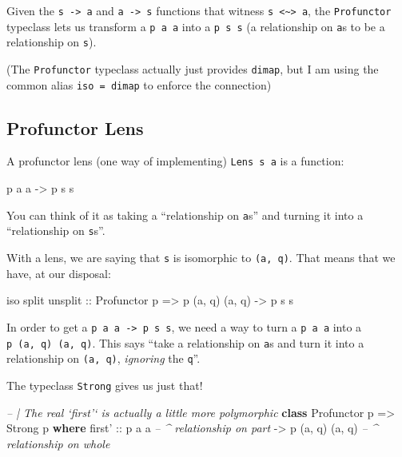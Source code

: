 \documentclass[]{article}
\newenvironment{Shaded}{}{}
\newcommand{\CommentTok}[1]{\textcolor[rgb]{0.38,0.63,0.69}{\textit{#1}}}
\newcommand{\DataTypeTok}[1]{\textcolor[rgb]{0.56,0.13,0.00}{#1}}
\newcommand{\KeywordTok}[1]{\textcolor[rgb]{0.00,0.44,0.13}{\textbf{#1}}}
\newcommand{\NormalTok}[1]{#1}
\newcommand{\OtherTok}[1]{\textcolor[rgb]{0.00,0.44,0.13}{#1}}
\begin{document}
Given the \texttt{s\ -\textgreater{}\ a} and \texttt{a\ -\textgreater{}\ s}
functions that witness
\texttt{s\ \textless{}\textasciitilde{}\textgreater{}\ a}, the
\texttt{Profunctor} typeclass lets us transform a \texttt{p\ a\ a} into a
\texttt{p\ s\ s} (a relationship on \texttt{a}s to be a relationship on
\texttt{s}).

(The \texttt{Profunctor} typeclass actually just provides \texttt{dimap}, but I
am using the common alias \texttt{iso\ =\ dimap} to enforce the connection)

\hypertarget{profunctor-lens}{%
\subsection{Profunctor Lens}\label{profunctor-lens}}

A profunctor lens (one way of implementing)
\texttt{Lens\textquotesingle{}\ s\ a} is a function:

\begin{Shaded}
\begin{Highlighting}[]
\NormalTok{p a a }\OtherTok{->}\NormalTok{ p s s}
\end{Highlighting}
\end{Shaded}

You can think of it as taking a ``relationship on \texttt{a}s'' and turning it
into a ``relationship on \texttt{s}s''.

With a lens, we are saying that \texttt{s} is isomorphic to \texttt{(a,\ q)}.
That means that we have, at our disposal:

\begin{Shaded}
\begin{Highlighting}[]
\NormalTok{iso split unsplit}
\OtherTok{    ::} \DataTypeTok{Profunctor}\NormalTok{ p}
    \OtherTok{=>}\NormalTok{ p (a, q) (a, q) }\OtherTok{->}\NormalTok{ p s s}
\end{Highlighting}
\end{Shaded}

In order to get a \texttt{p\ a\ a\ -\textgreater{}\ p\ s\ s}, we need a way to
turn a \texttt{p\ a\ a} into a \texttt{p\ (a,\ q)\ (a,\ q)}. This says ``take a
relationship on \texttt{a}s and turn it into a relationship on \texttt{(a,\ q)},
\emph{ignoring} the \texttt{q}''.

The typeclass \texttt{Strong} gives us just that!

\begin{Shaded}
\begin{Highlighting}[]
\CommentTok{-- | The real `first'` is actually a little more polymorphic}
\KeywordTok{class} \DataTypeTok{Profunctor}\NormalTok{ p }\OtherTok{=>} \DataTypeTok{Strong}\NormalTok{ p }\KeywordTok{where}
\NormalTok{    first'}
\OtherTok{        ::}\NormalTok{ p a a                }\CommentTok{-- ^ relationship on part}
        \OtherTok{->}\NormalTok{ p (a, q) (a, q)      }\CommentTok{-- ^ relationship on whole}
\end{Highlighting}
\end{Shaded}
\end{document}
